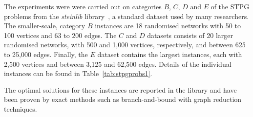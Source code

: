 \documentclass[journal]{IEEEtran}
\begin{document}
The experiments were were carried out on categories $B$, $C$, $D$ and $E$ of the STPG problems from the \textit{steinlib} library~\cite{steinlib}, a standard dataset used by many researchers. The smaller-scale, category $B$ instances are 18 randomised networks with 50 to 100 vertices and 63 to 200 edges. The $C$ and $D$ datasets consists of 20 larger randomised networks, with 500 and 1,000 vertices, respectively, and between 625 to 25,000 edges. Finally, the $E$ dataset contains the largest instances, each with 2,500 vertices and between 3,125 and 62,500 edges. Details of the individual instances can be found in Table~\ref{tab:stpgprobs1}. 

The optimal solutions for these instances are reported in the library and 
have been proven by exact methods such as branch-and-bound with graph reduction techniques.\par
\end{document}
